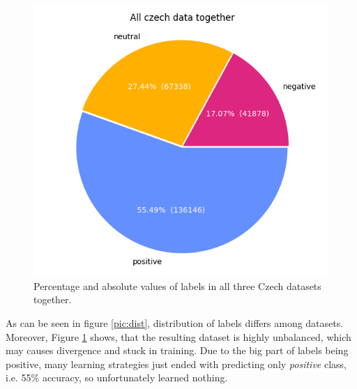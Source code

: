 \begin{figure}[!h]
\centering
\includegraphics[width=0.65\columnwidth]{../img/all.png}
\protect\caption{Percentage and absolute values of labels in all three Czech datasets together.}
\label{pic:dist_all}
\end{figure}
As can be seen in figure \ref{pic:dist}, distribution of labels differs among datasets. Moreover, Figure \ref{pic:dist_all} shows, that the resulting dataset is highly unbalanced, which may causes divergence and stuck in training. Due to the big part of labels being positive, many learning strategies just ended with predicting only \textit{positive} class, i.e. 55\% accuracy, so unfortunately learned nothing. 
